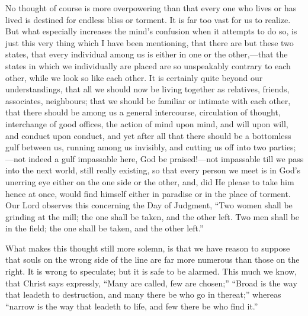 No thought of course is more overpowering than that every one who
lives or has lived is destined for endless bliss or torment. It is far
too vast for us to realize. But what especially increases the mind's
confusion when it attempts to do so, is just this very thing which I
have been mentioning, that there are but these two states, that every
individual among us is either in one or the other,—that the states
in which we individually are placed are so unspeakably contrary to
each other, while we look so like each other. It is certainly quite
beyond our understandings, that all we should now be living together
as relatives, friends, associates, neighbours; that we should be
familiar or intimate with each other, that there should be among us a
general intercourse, circulation of thought, interchange of good
offices, the action of mind upon mind, and will upon will, and conduct
upon conduct, and yet after all that there should be a bottomless gulf
between us, running among us invisibly, and cutting us off into two
parties;—not indeed a gulf impassable here, God be praised!—not
impassable till we pass into the next world, still really existing, so
that every person we meet is in God's unerring eye either on the one
side or the other, and, did He please to take him hence at once, would
find himself either in paradise or in the place of torment. Our Lord
observes this concerning the Day of Judgment, ``Two women shall be
grinding at the mill; the one shall be taken, and the other left. Two
men shall be in the field; the one shall be taken, and the other
left.''

What makes this thought still more solemn, is that we have reason
to suppose that souls on the wrong side of the line are far more
numerous than those on the right. It is wrong to speculate; but it is
safe to be alarmed. This much we know, that Christ says expressly,
``Many are called, few are chosen;'' ``Broad is the way
that leadeth to destruction, and many there be who go in
thereat;'' whereas ``narrow is the way that leadeth to life,
and few there be who find it.''

